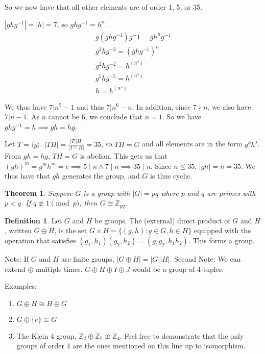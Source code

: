 \documentclass{article}
\theoremstyle{definition}
\newtheorem{definition}{Definition}
\theoremstyle{plain}
\newtheorem{theorem}{Theorem}
\theoremstyle{corollary}
\theoremstyle{lemma}
\begin{document}
So we now have that all other elements are of order 1, 5, or 35.

$|ghg^{-1}|=|h|=7$, so $ghg^{-1}=h^n$.
\begin{align}
    & g(ghg^{-1})g^-1=gh^ng^{-1} &\\
    & g^2hg^{-2}=(ghg^{-1})^n &\\
    & g^2hg^{-2}=h^{(n^2)} &\\
    & g^5hg^{-5}=h^{(n^5)} &\\
    & h=h^{(n^5)}
\end{align}

We thus have $7|n^5-1$ and thus $7|n^6-n$. In addition, since $7\nmid n$, we also have $7|n-1$. As $n$ cannot be 6, we conclude that $n=1$. So we have $ghg^{-1}=h\implies gh=hg$.

Let $T=\langle g\rangle$. $|TH|=\frac{|T||H|}{|T\cap H|}=35$, so $TH=G$ and all elements are in the form $g^kh^j$. From $gh=hg$, $TH=G$ is abelian. This gets us that $(gh)^m=g^mh^m=e\implies 5\mid n\land 7\mid n\implies 35\mid n$. Since $n\leq35$, $|gh|=n=35$. We thus have that $gh$ generates the group, and $G$ is thus cyclic.

\begin{theorem}
Suppose $G$ is a group with $|G|=pq$ where $p$ and $q$ are primes with $p<q$. If $q\not\equiv1\pmod{p}$, then $G\cong\mathbb{Z}_{pq}$.
\end{theorem}

\begin{definition}
Let $G$ and $H$ be groups. The (external) direct product of $G$ and $H$, written $G\oplus H$, is the set $G\times H=\{(g,h):g\in G,h\in H\}$ equipped with the operation that satisfies $(g_1,h_1)(g_2,h_2)=(g_1g_2,h_1h_2)$. This forms a group.
\end{definition}

Note: If $G$ and $H$ are finite groups, $|G\oplus H|=|G||H|$.
Second Note: We can extend $\oplus$ multiple times. $G\oplus H\oplus I\oplus J$ would be a group of 4-tuples.

Examples:
\begin{enumerate}
    \item $G\oplus H\cong H\oplus G$
    \item $G\oplus \{e\}\cong G$
    \item The Klein 4 group, $\mathbb{Z}_2\oplus\mathbb{Z}_2\ncong\mathbb{Z}_4$. Feel free to demonstrate that the only groups of order 4 are the ones mentioned on this line up to isomorphism.
\end{enumerate}
\end{document}
